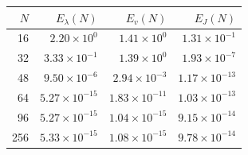 \begin{tabular}{rrrr}
\toprule
$N$ & $E_\lambda(N)$ & $E_v(N)$ & $E_J(N)$\\
\midrule
16 & $2.20\times10^{0}$ & $1.41\times10^{0}$ & $1.31\times10^{-1}$\\
32 & $3.33\times10^{-1}$ & $1.39\times10^{0}$ & $1.93\times10^{-7}$\\
48 & $9.50\times10^{-6}$ & $2.94\times10^{-3}$ & $1.17\times10^{-13}$\\
64 & $5.27\times10^{-15}$ & $1.83\times10^{-11}$ & $1.03\times10^{-13}$\\
96 & $5.27\times10^{-15}$ & $1.04\times10^{-15}$ & $9.15\times10^{-14}$\\
256 & $5.33\times10^{-15}$ & $1.08\times10^{-15}$ & $9.78\times10^{-14}$\\
\bottomrule
\end{tabular}
